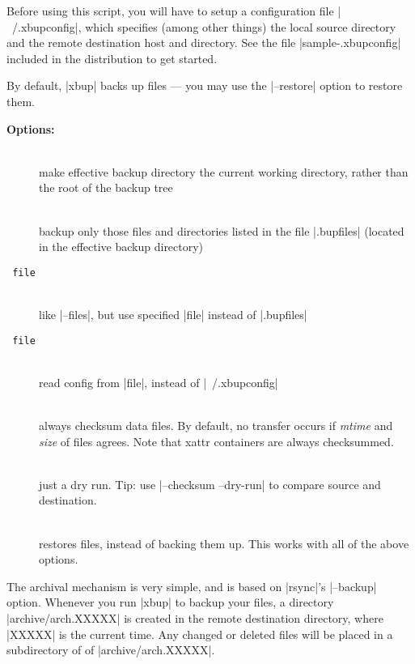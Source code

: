 \documentclass[11pt]{article}
\begin{document}
Before using this script, you will have to setup
a configuration file |~/.xbupconfig|,
which specifies (among other things) the local source directory
and
the remote destination host and directory.
See the file |sample-.xbupconfig| included in the distribution
to get started.

By default, |xbup| backs up files --- you may use the |--restore|
option
to restore them.


\medbreak
{\bf Options:}


\begin{description}
\item[{\tt{}}] \ \\
make effective backup directory the current working directory,
rather than the root of the backup tree

\item[{\tt{}}] \ \\
backup only those files and directories listed in the file
|.bupfiles| (located in the effective backup directory)

\item[{\tt{} file}]  \ \\
like |--files|, but use specified |file| instead of |.bupfiles|
                
\item[{\tt{} file}] \ \\ 
read config from |file|, instead of |~/.xbupconfig|

\item[{\tt{}}] \ \\
always checksum data files. By default, no transfer occurs if \emph{mtime}
and \emph{size} of files agrees.
Note that xattr containers are always checksummed.

\item[{\tt{}}] \ \\
just a dry run.  Tip: use |--checksum --dry-run| to compare source and
destination.

\item[{\tt{}}] \ \\
restores files, instead of backing them up.
This works with all of the above options.

\end{description}

The archival mechanism is very simple, and is based on
|rsync|'s |--backup| option.
Whenever you run |xbup| to backup your files,
a directory |archive/arch.XXXXX| is created in the remote destination
directory, where |XXXXX| is the current time.
Any changed or deleted files will be placed
in a subdirectory of of |archive/arch.XXXXX|.
\end{document}
